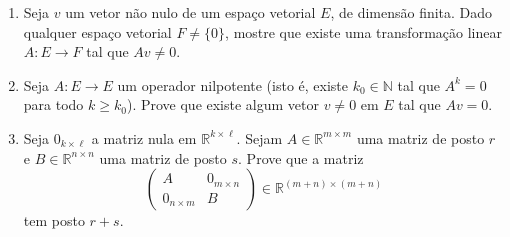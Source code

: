\documentclass[12pt]{article}
\begin{document}
\begin{enumerate}
\item Seja $v$ um vetor não nulo de um espaço vetorial $E$, de dimensão finita. Dado qualquer espaço vetorial $F\ne \{0\}$, mostre que existe uma transformação linear $A:E\rightarrow F$ tal que $Av\ne 0$.
  
\item Seja $A:E\rightarrow E$ um operador nilpotente (isto é, existe $k_0 \in \mathbb{N}$ tal que $A^k = 0$ para todo $k\geq k_0$). Prove que existe algum vetor $v\ne 0$ em $E$ tal que $Av=0$. 

\item Seja $0_{k \times \ell }$ a matriz nula em ${\mathbb{R}}^{k\times \ell}$. Sejam $A\in {\mathbb{R}}^{m\times m}$ uma matriz de posto $r$ e $B\in {\mathbb{R}}^{n\times n}$ uma matriz de posto $s$. Prove que a matriz 
  $$\begin{pmatrix}
    A & 0_{m\times n}\\
    0_{n\times m} & B
  \end{pmatrix} \in {\mathbb{R}}^{(m+n) \times (m+n)}$$
  tem posto $r+s$.
\end{enumerate}
\end{document}
